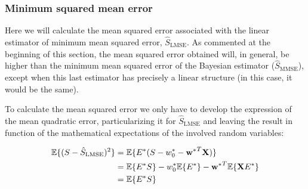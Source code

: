 \subsubsection{Minimum squared mean error}

Here we will calculate the mean squared error associated with the linear estimator of minimum mean squared error, $\hat S_\text{LMSE}$. As commented at the beginning of this section, the mean squared  error obtained will, in general, be higher than the minimum mean squared error of the Bayesian estimator ($\hat S_\text{MMSE}$), except when this last estimator has precisely a linear structure (in this case, it would be the same).

To calculate the mean squared error we only have to develop the expression of the mean quadratic error, particularizing it for $\hat S_\text{LMSE}$ and leaving the result in function of the mathematical expectations of the involved random variables:

\begin{align}
\mathbb{E}\{(S - \hat S_\text{LMSE})^2\} 
   & = \mathbb{E}\{E^*(S - w_0^* - {{\bf w}^*}^T {\bf X})\} \nonumber\\ 
   & = \mathbb{E}\{E^* S\} 
     - w_0^* \mathbb{E}\{E^*\} 
     - {{\bf w}^*}^T \mathbb{E}\{{\bf X}E^*\}  \nonumber\\
   & = \mathbb{E}\{E^* S\} 
\end{align}

